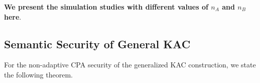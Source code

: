 \textbf{We present the simulation studies with different values of $n_A$ and $n_B$ here}.

% 



\subsection{Semantic Security of General KAC}
\label{subsec:security_twotier}

For the non-adaptive CPA security of the generalized KAC construction, we state the following theorem.

